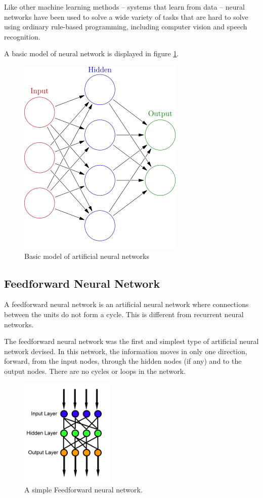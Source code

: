\documentclass[14pt,a4paper]{extarticle}
\begin{document}
Like other machine learning methods – systems that learn from data – neural networks have been used to solve a wide variety of tasks that are hard to solve using ordinary rule-based programming, including computer vision and speech recognition.

A basic model of neural network is displayed in figure \ref{fig:neural_net_model}.

		\begin{figure}[H]
			\includegraphics[width=.4\textwidth, center]{neural_net_example.png}
			\caption{Basic model of artificial neural networks}
			\label{fig:neural_net_model}
		\end{figure}
	
	\subsection{Feedforward Neural Network}
	
	A feedforward neural network is an artificial neural network where connections between the units do not form a cycle. This is different from recurrent neural networks.

The feedforward neural network was the first and simplest type of artificial neural network devised. In this network, the information moves in only one direction, forward, from the input nodes, through the hidden nodes (if any) and to the output nodes. There are no cycles or loops in the network.

		\begin{figure}[H]
			\includegraphics[width=0.4\textwidth, center]{Feed_forward_neural_net.png}
			\caption{A simple Feedforward neural network.}
		\end{figure}
\end{document}
